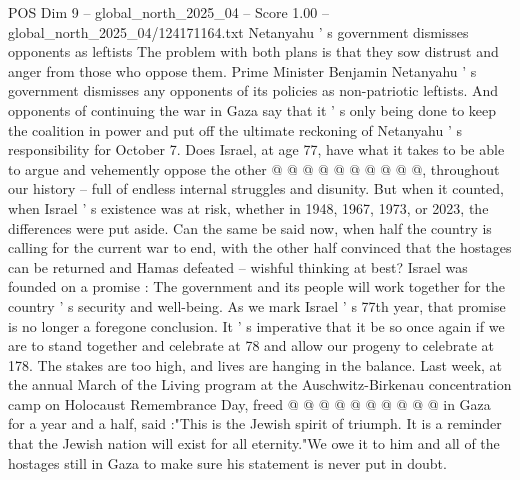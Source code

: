 \begin{textsample}{POS Dim 9 – global\_north\_2025\_04 – Score 1.00 – global\_north\_2025\_04/124171164.txt}
Netanyahu ' s government dismisses opponents as leftists The problem with both plans is that they sow distrust and anger from those who oppose them.
Prime Minister Benjamin Netanyahu ' s government dismisses any opponents of its policies as non-patriotic leftists.
And opponents of continuing the war in Gaza say that it ' s only being done to keep the coalition in power and put off the ultimate reckoning of Netanyahu ' s responsibility for October 7.
Does Israel, at age 77, have what it takes to be able to argue and vehemently oppose the other @ @ @ @ @ @ @ @ @ @, throughout our history -- full of endless internal struggles and disunity.
But when it counted, when Israel ' s existence was at risk, whether in 1948, 1967, 1973, or 2023, the differences were put aside.
Can the same be said now, when half the country is calling for the current war to end, with the other half convinced that the hostages can be returned and Hamas defeated -- wishful thinking at best?
Israel was founded on a promise : The government and its people will work together for the country ' s security and well-being.
As we mark Israel ' s 77th year, that promise is no longer a foregone conclusion.
It ' s imperative that it be so once again if we are to stand together and celebrate at 78 and allow our progeny to celebrate at 178.
The stakes are too high, and lives are hanging in the balance.
Last week, at the annual March of the Living program at the Auschwitz-Birkenau concentration camp on Holocaust Remembrance Day, freed @ @ @ @ @ @ @ @ @ @ in Gaza for a year and a half, said :"This is the Jewish spirit of triumph.
It is a reminder that the Jewish nation will exist for all eternity."We owe it to him and all of the hostages still in Gaza to make sure his statement is never put in doubt.

\end{textsample}
